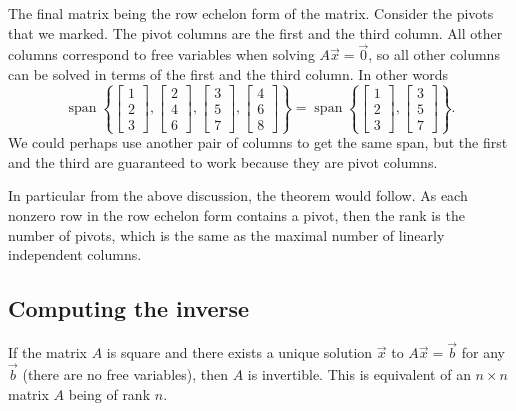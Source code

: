 The final matrix being the row echelon form of the matrix.
Consider the pivots that we marked.
The pivot columns are the first and the third
column.  All other columns correspond to free variables when solving
$A \vec{x} = \vec{0}$, so all other columns can be solved in terms of the first and
the third column.  In other words
\begin{equation*}
\operatorname{span}
\left\{
\begin{bmatrix}
1 \\
2 \\
3 
\end{bmatrix}
,
\begin{bmatrix}
2 \\
4 \\
6
\end{bmatrix}
,
\begin{bmatrix}
3 \\
5 \\
7
\end{bmatrix}
,
\begin{bmatrix}
4 \\
6 \\
8
\end{bmatrix}
\right\}
=
\operatorname{span}
\left\{
\begin{bmatrix}
1 \\
2 \\
3
\end{bmatrix}
,
\begin{bmatrix}
3 \\
5 \\
7
\end{bmatrix}
\right\} .
\end{equation*}
We could perhaps use another pair of columns to get the same span, but the
first and the third are guaranteed to work because they are pivot columns.

In particular from the above discussion, the theorem would follow.
As each nonzero row
in the row echelon form contains a pivot, then the rank is the number of
pivots, which is the same as the maximal number of linearly independent
columns.

\subsection{Computing the inverse}

If the matrix $A$ is square and there exists a unique solution
$\vec{x}$ to $A \vec{x} = \vec{b}$ for any $\vec{b}$ (there are no free
variables), then $A$ is invertible.
This is equivalent of an $n \times n$ matrix $A$ being of rank $n$.

